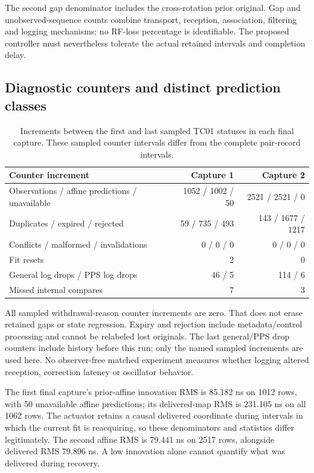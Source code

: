 \documentclass[11pt,letterpaper]{article}
\begin{document}
The second gap denominator includes the cross-rotation prior original. Gap and unobserved-sequence counts combine transport, reception, association, filtering and logging mechanisms; no RF-loss percentage is identifiable. The proposed controller must nevertheless tolerate the actual retained intervals and completion delay.

\subsection{Diagnostic counters and distinct prediction classes}
\begin{table}[h]\centering\small
\caption{Increments between the first and last sampled TC01 statuses in each final capture. These sampled counter intervals differ from the complete pair-record intervals.}\label{tab:counters}
\begin{tabular}{@{}lrr@{}}\toprule
Counter increment & Capture 1 & Capture 2\\\midrule
Observations / affine predictions / unavailable &1052 / 1002 / 50&2521 / 2521 / 0\\
Duplicates / expired / rejected &59 / 735 / 493&143 / 1677 / 1217\\
Conflicts / malformed / invalidations &0 / 0 / 0&0 / 0 / 0\\
Fit resets &2&0\\
General log drops / PPS log drops &46 / 5&114 / 6\\
Missed internal compares &7&3\\\bottomrule
\end{tabular}
\end{table}

All sampled withdrawal-reason counter increments are zero. That does not erase retained gaps or state regression. Expiry and rejection include metadata/control processing and cannot be relabeled lost originals. The last general/PPS drop counters include history before this run; only the named sampled increments are used here. No observer-free matched experiment measures whether logging altered reception, correction latency or oscillator behavior.

The first final capture's prior-affine innovation RMS is 85.182 ns on 1012 rows, with 50 unavailable affine predictions; its delivered-map RMS is 231.105 ns on all 1062 rows. The actuator retains a causal delivered coordinate during intervals in which the current fit is reacquiring, so these denominators and statistics differ legitimately. The second affine RMS is 79.441 ns on 2517 rows, alongside delivered RMS 79.896 ns. A low innovation alone cannot quantify what was delivered during recovery.
\end{document}
